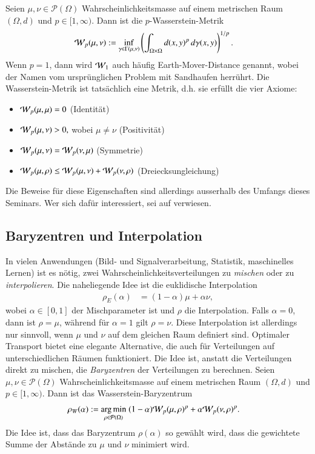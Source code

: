 Seien $\mu, \nu \in \mathcal{P}(\Omega)$ Wahrscheinlichkeitsmasse
auf einem metrischen Raum $(\Omega, d)$ und $p \in [1, \infty)$.
Dann ist die $p$-Wasserstein-Metrik
\begin{align}
\wasserstein(\mu, \nu)
&:=
\inf_{\gamma \in \Gamma(\mu, \nu)}
\left(
\int_{\Omega \times \Omega} d(x,y)^p\, d\gamma(x,y)
\right)^{1/p}
.
\label{mongekant:eq:wasserstein_metric}
\end{align}
Wenn $p=1$,
dann wird $\wasserstein[1]$ auch häufig Earth-Mover-Distance genannt,
wobei der Namen vom ursprünglichen Problem mit Sandhaufen herrührt.
Die Wasserstein-Metrik ist tatsächlich eine Metrik,
d.h. sie erfüllt die vier Axiome:
\begin{itemize}
\item $\wasserstein(\mu, \mu) = 0$ (Identität)
\item $\wasserstein(\mu, \nu) > 0,$ wobei $\mu \neq \nu$ (Positivität)
\item $\wasserstein(\mu, \nu) = \wasserstein(\nu, \mu)$ (Symmetrie)
\item $\wasserstein(\mu, \rho) \leq \wasserstein(\mu, \nu) + \wasserstein(\nu, \rho)$
(Dreiecksungleichung)
\end{itemize}
Die Beweise für diese Eigenschaften sind allerdings ausserhalb des Umfangs dieses Seminars.
Wer sich dafür interessiert,
sei auf \cite{mongekant:villani} verwiesen.

\subsection{Baryzentren und Interpolation
\label{mongekant:subsection:interpolation}}

In vielen Anwendungen
(Bild‑ und Signalverarbeitung, Statistik, maschinelles Lernen) ist es nötig,
zwei Wahrscheinlichkeitsverteilungen zu \emph{mischen}
oder zu \emph{interpolieren}.
Die naheliegende Idee ist die euklidische Interpolation
\begin{align}
\rho_E(\alpha)
&=
(1-\alpha) \mu + \alpha \nu
\label{mongekant:eq:euclidean_barycenter}
,
\end{align}
wobei $\alpha \in [0,1]$ der Mischparameter ist und $\rho$ die Interpolation.
Falls $\alpha=0$,
dann ist $\rho=\mu$,
während für $\alpha=1$ gilt $\rho=\nu$.
Diese Interpolation ist allerdings nur sinnvoll,
wenn $\mu$ und $\nu$ auf dem gleichen Raum definiert sind.
Optimaler Transport bietet eine elegante Alternative,
die auch für Verteilungen auf unterschiedlichen Räumen funktioniert.
Die Idee ist,
anstatt die Verteilungen direkt zu mischen,
die \emph{Baryzentren} der Verteilungen zu berechnen.
Seien $\mu, \nu \in \mathcal{P}(\Omega)$ Wahrscheinlichkeitsmasse
auf einem metrischen Raum $(\Omega, d)$
und $p \in [1, \infty)$.
Dann ist das Wasserstein-Baryzentrum
\begin{align}
\rho_W(\alpha)
&:=
\underset{\rho \in \mathcal{P}(\Omega)}{\mathrm{arg\,min}}\;
(1-\alpha) \wasserstein(\mu, \rho)^p
+ \alpha \wasserstein(\nu, \rho)^p
\label{mongekant:eq:wasserstein_barycenter}
.
\end{align}
Die Idee ist,
dass das Baryzentrum $\rho(\alpha)$
so gewählt wird,
dass die gewichtete Summe der Abstände zu $\mu$ und $\nu$ minimiert wird.

